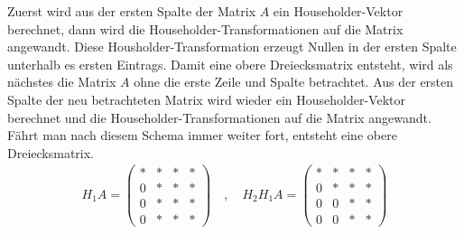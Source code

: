 Zuerst wird aus der ersten Spalte der Matrix $A$ ein Householder-Vektor berechnet, dann wird die  Householder-Transformationen auf die Matrix angewandt.
Diese Housholder-Transformation erzeugt Nullen in der ersten Spalte unterhalb es ersten Eintrags.
Damit eine obere Dreiecksmatrix entsteht, wird als nächstes die Matrix $A$ ohne die erste Zeile und Spalte betrachtet. Aus der ersten Spalte der neu betrachteten Matrix wird wieder ein Householder-Vektor berechnet und die Householder-Transformationen auf die Matrix angewandt.
Fährt man nach diesem Schema immer weiter fort, entsteht eine obere Dreiecksmatrix.
\begin{align*}
	H_1 A= \left( 
	\begin{array}{cccc}
	* & * & * & * \\ 
	0 & * & * & * \\ 
	0 & * & * & * \\ 
	0 & * & * & *
	\end{array}
	\right)
	\quad , \quad
	H_2 H_1 A= \left( 
	\begin{array}{cccc}
	* & * & * & * \\ 
	0 & * & * & * \\ 
	0 & 0 & * & * \\ 
	0 & 0 & * & *
	\end{array}
	\right)
\end{align*} 


